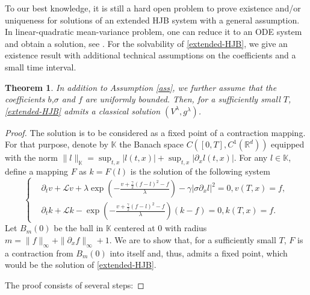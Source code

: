 \documentclass[11pt]{article}
\newtheorem{theorem}{Theorem}[section]
\begin{document}
To our best knowledge, it is still a hard open problem to prove existence and/or uniqueness for solutions of an extended HJB system with a general assumption. In linear-quadratic mean-variance problem, one can reduce it to an ODE system and obtain a solution, see \cite{bjork2014mean}.   
For the solvability of \eqref{extended-HJB}, we give an existence result with additional technical assumptions on the coefficients and a small time interval.
\begin{theorem} \label{thm3.2}
 In addition to Assumption \ref{ass}, we further assume that the coefficients $b$,$\sigma$ and $f$ are uniformly bounded.  Then, for a sufficiently small $T$, \eqref{extended-HJB} admits a classical solution $(V^\lambda,g^\lambda)$.
\end{theorem}
\begin{proof}The solution is to be considered as a fixed point of a contraction mapping. For that purpose, 
denote by $\mathbb K$ the Banach space $C([0,T],C^1(\mathbb R^d))$ equipped with the norm $\|l\|_{\mathbb K}=\sup_{t,x}|l(t,x)|+\sup_{t,x}|\partial_x l(t,x)|$. For any $l \in \mathbb K$, define a mapping $F$ as $k=F(l)$ is the solution of the following system
\begin{equation}\label{decouple-HJB}
\left\{
\begin{split}
&\partial_t v+\mathcal Lv+\lambda\exp(-\frac{v+\frac{\gamma}{2}(f-l)^2-f}{\lambda})-\gamma |\sigma \partial_x l|^2=0, v(T,x)=f,\\
& \partial_tk+\mathcal L k-\exp(-\frac{v+\frac{\gamma}{2}(f-l)^2-f}{\lambda})(k-f)=0,k(T,x)=f.
\end{split}
\right.
\end{equation}
Let $B_m(0)$ be the ball in $\mathbb K$ centered at $0$ with radius $m=\|f\|_{\infty}+\|\partial_x f\|_{\infty}+1$. We are to show that, for a sufficiently small $T$, $F$ is a contraction from $B_m(0)$ into itself and, thus, admits a fixed point, which would  be the solution of \eqref{extended-HJB}. 

The proof consists of several steps:


\end{proof}
\end{document}
